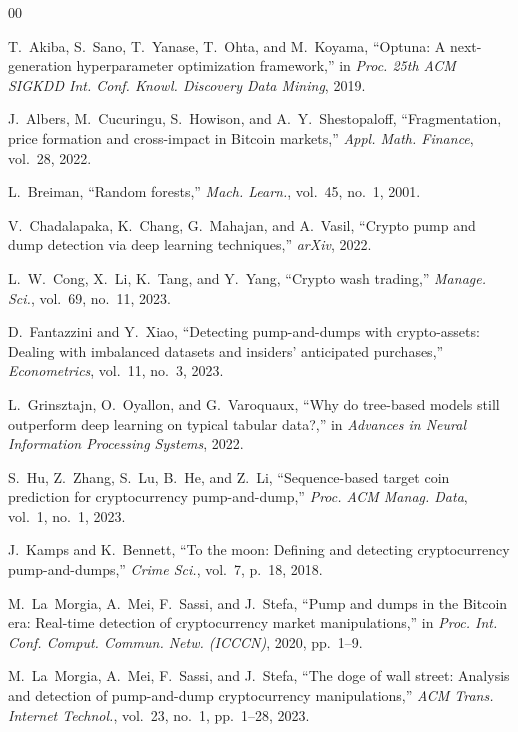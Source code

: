\documentclass{ieeeaccess}
\begin{document}
\begin{thebibliography}{00}

 T.~Akiba, S.~Sano, T.~Yanase, T.~Ohta, and M.~Koyama, ``Optuna: A next-generation hyperparameter optimization framework,'' in \emph{Proc. 25th ACM SIGKDD Int. Conf. Knowl. Discovery Data Mining}, 2019.

 J.~Albers, M.~Cucuringu, S.~Howison, and A.~Y.~Shestopaloff, ``Fragmentation, price formation and cross-impact in Bitcoin markets,'' \emph{Appl. Math. Finance}, vol.~28, 2022.

 L.~Breiman, ``Random forests,'' \emph{Mach. Learn.}, vol.~45, no.~1, 2001.

 V.~Chadalapaka, K.~Chang, G.~Mahajan, and A.~Vasil, ``Crypto pump and dump detection via deep learning techniques,'' \emph{arXiv}, 2022.

 L.~W.~Cong, X.~Li, K.~Tang, and Y.~Yang, ``Crypto wash trading,'' \emph{Manage. Sci.}, vol.~69, no.~11, 2023.

 D.~Fantazzini and Y.~Xiao, ``Detecting pump-and-dumps with crypto-assets: Dealing with imbalanced datasets and insiders' anticipated purchases,'' \emph{Econometrics}, vol.~11, no.~3, 2023.

 L.~Grinsztajn, O.~Oyallon, and G.~Varoquaux, ``Why do tree-based models still outperform deep learning on typical tabular data?,'' in \emph{Advances in Neural Information Processing Systems}, 2022.

 S.~Hu, Z.~Zhang, S.~Lu, B.~He, and Z.~Li, ``Sequence-based target coin prediction for cryptocurrency pump-and-dump,'' \emph{Proc. ACM Manag. Data}, vol.~1, no.~1, 2023.

 J.~Kamps and K.~Bennett, ``To the moon: Defining and detecting cryptocurrency pump-and-dumps,'' \emph{Crime Sci.}, vol.~7, p.~18, 2018.

 M.~La~Morgia, A.~Mei, F.~Sassi, and J.~Stefa, ``Pump and dumps in the Bitcoin era: Real-time detection of cryptocurrency market manipulations,'' in \emph{Proc. Int. Conf. Comput. Commun. Netw. (ICCCN)}, 2020, pp.~1--9.

 M.~La~Morgia, A.~Mei, F.~Sassi, and J.~Stefa, ``The doge of wall street: Analysis and detection of pump-and-dump cryptocurrency manipulations,'' \emph{ACM Trans. Internet Technol.}, vol.~23, no.~1, pp.~1--28, 2023.


\end{thebibliography}
\end{document}
